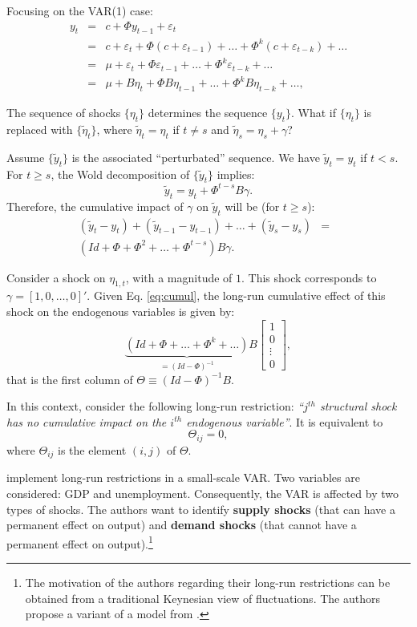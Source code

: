 \documentclass[
  12pt,
]{book}
\theoremstyle{definition}
\theoremstyle{definition}
\theoremstyle{definition}
\theoremstyle{definition}
\theoremstyle{remark}
\begin{document}
Focusing on the VAR(1) case:
\begin{eqnarray}
y_{t} &=& c+\Phi y_{t-1}+\varepsilon_{t}\\
& = & c+\varepsilon_{t}+\Phi(c+\varepsilon_{t-1})+\ldots+\Phi^{k}(c+\varepsilon_{t-k})+\ldots \nonumber \\
& = & \mu +\varepsilon_{t}+\Phi\varepsilon_{t-1}+\ldots+\Phi^{k}\varepsilon_{t-k}+\ldots \\
& = & \mu +B\eta_{t}+\Phi B\eta_{t-1}+\ldots+\Phi^{k}B\eta_{t-k}+\ldots,
\end{eqnarray}

The sequence of shocks \(\{\eta_t\}\) determines the sequence \(\{y_t\}\). What if \(\{\eta_t\}\) is replaced with \(\{\tilde{\eta}_t\}\), where \(\tilde{\eta}_t=\eta_t\) if \(t \ne s\) and \(\tilde{\eta}_s=\eta_s + \gamma\)?

Assume \(\{\tilde{y}_t\}\) is the associated ``perturbated'' sequence. We have \(\tilde{y}_t = y_t\) if \(t<s\). For \(t \ge s\), the Wold decomposition of \(\{\tilde{y}_t\}\) implies:
\[
\tilde{y}_t = y_t + \Phi^{t-s} B \gamma.
\]
Therefore, the cumulative impact of \(\gamma\) on \(\tilde{y}_t\) will be (for \(t \ge s\)):
\begin{eqnarray}
(\tilde{y}_t - y_t) +  (\tilde{y}_{t-1} - y_{t-1}) + \dots +  (\tilde{y}_s - y_s) &=& \nonumber \\
(Id + \Phi + \Phi^2 + \dots + \Phi^{t-s}) B \gamma.&& \label{eq:cumul}
\end{eqnarray}

Consider a shock on \(\eta_{1,t}\), with a magnitude of \(1\). This shock corresponds to \(\gamma = [1,0,\dots,0]'\). Given Eq. \eqref{eq:cumul}, the long-run cumulative effect of this shock on the endogenous variables is given by:
\[
\underbrace{(Id+\Phi+\ldots+\Phi^{k}+\ldots)}_{=(Id - \Phi)^{-1}}B\left[\begin{array}{c}
1\\
0\\
\vdots\\
0\end{array}\right],
\]
that is the first column of \(\Theta \equiv (Id - \Phi)^{-1}B\).

In this context, consider the following long-run restriction: \emph{``\(j^{th}\) structural shock has no cumulative impact on the \(i^{th}\) endogenous variable''}. It is equivalent to
\[
\Theta_{ij}=0,
\]
where \(\Theta_{ij}\) is the element \((i,j)\) of \(\Theta\).

\citet{Blanchard_Quah_1989} implement long-run restrictions in a small-scale VAR. Two variables are considered: GDP and unemployment. Consequently, the VAR is affected by two types of shocks. The authors want to identify \textbf{supply shocks} (that can have a permanent effect on output) and \textbf{demand shocks} (that cannot have a permanent effect on output).\footnote{The motivation of the authors regarding their long-run restrictions can be obtained from a traditional Keynesian view of fluctuations. The authors propose a variant of a model from \citet{Fischer_1977}.
}
\end{document}
